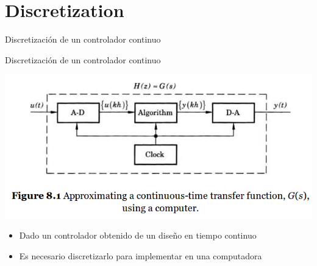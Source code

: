 \documentclass[presentation,aspectratio=1610]{beamer}
\begin{document}
\section{Discretization}
\label{sec:org7cbd88e}
\begin{frame}[label={sec:orgc41671e}]{Discretización de un controlador continuo}
\end{frame}
\begin{frame}[label={sec:org986cc44}]{Discretización de un controlador continuo}
\begin{center}
\includegraphics[width=0.7\linewidth]{../../figures/fig8-1.png}
\end{center}

\begin{itemize}
\item Dado un controlador obtenido de un diseño en tiempo continuo
\item Es necesario discretizarlo para implementar en una computadora
\end{itemize}
\end{frame}
\end{document}
